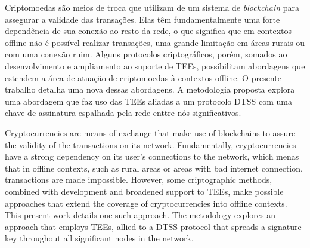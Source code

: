 \documentclass[
  12pt,
  a4paper,
  oneside,
  article,
]{abntex2}
\begin{document}
\begin{resumo}
	Criptomoedas são meios de troca que utilizam de um sistema de \textit{blockchain} para assegurar a validade das transações. Elas têm fundamentalmente uma forte dependência de sua conexão ao resto da rede, o que significa que em contextos offline não é possível realizar transações, uma grande limitação em áreas rurais ou com uma conexão ruim. Alguns protocolos criptográficos, porém, somados ao desenvolvimento e ampliamento ao suporte de TEEs, possibilitam abordagens que estendem a área de atuação de criptomoedas à contextos offline. O presente trabalho detalha uma nova dessas abordagens. A metodologia proposta explora uma abordagem que faz uso das TEEs aliadas a um protocolo DTSS com uma chave de assinatura espalhada pela rede enttre nós significativos.
\end{resumo}

\begin{resumo}[english]
	Cryptocurrencies are means of exchange that make use of blockchains to assure the validity of the transactions on its network. Fundamentally, cryptocurrencies have a strong dependency on its user's connections to the network, which menas that in offline contexts, such as rural areas or areas with bad internet connection, transactions are made impossible. However, some criptographic methods, combined with development and broadened support to TEEs, make possible approaches that extend the coverage of cryptocurrencies into offline contexts. This present work details one such approach. The metodology explores an approach that employs TEEs, allied to a DTSS protocol that spreads a signature key throughout all significant nodes in the network.
\end{resumo}

\end{document}
